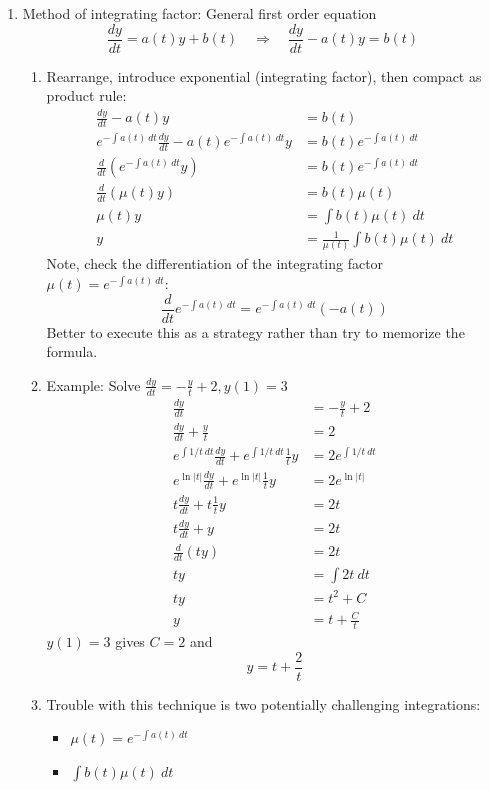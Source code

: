 \documentclass{article}
\newcommand{\ds}{\displaystyle}
\begin{document}
\begin{enumerate}
\item Method of integrating factor: General first order equation
\[
\frac{dy}{dt} = a(t)y + b(t) \quad \Rightarrow \quad \frac{dy}{dt} - a(t)y = b(t)
\]
\begin{enumerate}
\item Rearrange, introduce exponential (integrating factor), then compact as product rule:
\begin{align*}
\frac{dy}{dt} - a(t)y &= b(t) \\
e^{-\int a(t)~dt}\frac{dy}{dt} - a(t)e^{-\int a(t)~dt}y &= b(t)e^{-\int a(t)~dt} \\
\frac{d}{dt} \left(e^{-\int a(t)~dt} y \right) &= b(t) e^{-\int a(t)~dt} \\
\frac{d}{dt} \left(\mu(t) y \right) &= b(t) \mu(t) \\
\mu(t) y  &= \int b(t) \mu(t)~dt \\
y  &= \frac{1}{\mu(t)} \int b(t) \mu(t)~dt
\end{align*}
Note, check the differentiation of the integrating factor $\ds \mu(t) = e^{-\int a(t)~dt}$:
\[
\frac{d}{dt} e^{-\int a(t)~dt} = e^{-\int a(t)~dt}(-a(t))
\]
Better to execute this as a strategy rather than try to memorize the formula.
\item Example: Solve $\ds \frac{dy}{dt} = -\frac{y}{t}+2, y(1)=3$
\begin{align*}
\frac{dy}{dt} &= -\frac{y}{t}+2 \\
\frac{dy}{dt}+\frac{y}{t} &= 2 \\
e^{\int 1/t~dt}\frac{dy}{dt}+e^{\int 1/t~dt} \frac{1}{t}y &= 2e^{\int 1/t~dt} \\
e^{\ln|t|}\frac{dy}{dt}+e^{\ln|t|} \frac{1}{t}y &= 2e^{\ln|t|} \\
t \frac{dy}{dt}+ t \frac{1}{t}y &= 2t \\
t \frac{dy}{dt}+ y &= 2t \\
\frac{d}{dt} (ty) &= 2t \\
ty &= \int 2t ~dt \\
ty &= t^2+C \\
y &= t + \frac{C}{t}
\end{align*}
$y(1)=3$ gives $C=2$ and
\[
y = t + \frac{2}{t}
\]
\item Trouble with this technique is two potentially challenging integrations:
\begin{itemize}
\item $\ds \mu(t) = e^{-\int a(t)~dt}$
\item $\ds \int b(t)\mu(t)~dt$
\end{itemize}

\end{enumerate}

\end{enumerate}
\end{document}
